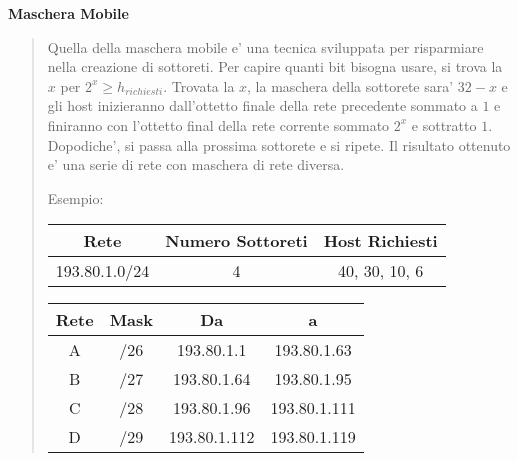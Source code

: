 \documentclass{article}
\begin{document}
{    \textbf{Maschera Mobile}
    \begin{quote}
      Quella della maschera mobile e' una tecnica sviluppata per risparmiare nella creazione di sottoreti. Per capire quanti bit bisogna usare, si trova la $ x $ per $ 2^x \geqslant h_{richiesti} $. Trovata la $ x $, la maschera della sottorete sara' $ 32 - x $ e gli host inizieranno dall'ottetto finale della rete precedente sommato a $ 1 $ e finiranno con l'ottetto final della rete corrente sommato $ 2^x $ e sottratto $ 1 $. Dopodiche', si passa alla prossima sottorete e si ripete. Il risultato ottenuto e' una serie di rete con maschera di rete diversa.

      Esempio:

      \begin{tabular}{ |c|c|c| }
        \hline
        Rete & Numero Sottoreti & Host Richiesti \\
        \hline
        193.80.1.0/24 & 4 & 40, 30, 10, 6 \\
        \hline
      \end{tabular}

      \begin{tabular}{ |c|c|c|c| }
        \hline
        Rete & Mask & Da & a \\
        \hline
        A & /26 & 193.80.1.1 & 193.80.1.63 \\
        B & /27 & 193.80.1.64 & 193.80.1.95 \\
        C & /28 & 193.80.1.96 & 193.80.1.111 \\
        D & /29 & 193.80.1.112 & 193.80.1.119 \\
        \hline
      \end{tabular}
    \end{quote}
  }

  \pagebreak
\end{document}
